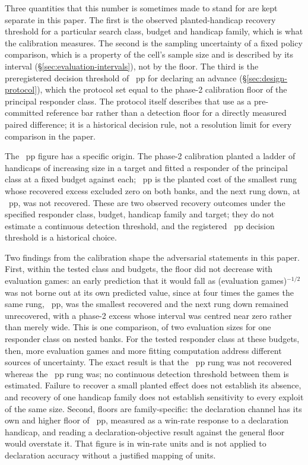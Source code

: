 Three quantities that this number is sometimes made to stand for are kept separate in this paper.
The first is the observed planted-handicap recovery threshold for a particular search class,
budget and handicap family, which is what the calibration measures. The second is the sampling
uncertainty of a fixed policy comparison, which is a property of the cell's sample size and is
described by its interval (\S\ref{sec:evaluation-intervals}), not by the floor. The third is the
preregistered decision threshold of \vsevenPrimaryFloor{}~pp for declaring an advance
(\S\ref{sec:design-protocol}), which the protocol set equal to the phase-2 calibration floor of the
principal responder class. The protocol itself describes that use as a pre-committed reference bar
rather than a detection floor for a directly measured paired difference; it is a historical
decision rule, not a resolution limit for every comparison in the paper.

The \vsevenPrimaryFloor{}~pp figure has a specific origin. The phase-2 calibration planted a ladder
of handicaps of increasing size in a \vsix{} target and fitted a responder of the principal class at
a fixed budget against each; \vsevenPrimaryFloor{}~pp is the planted cost of the smallest rung
whose recovered excess excluded zero on both banks, and the next rung down, at
\vsevenFloorRungBelow{}~pp, was not recovered. These are two observed recovery outcomes under the
specified responder class, budget, handicap family and target; they do not estimate a continuous
detection threshold, and the registered \vsevenPrimaryFloor{}~pp decision threshold is a
historical choice.

Two findings from the calibration shape the adversarial statements in this paper. First, within the
tested class and budgets, the floor did not decrease with evaluation games: an early prediction that
it would fall as (evaluation games)$^{-1/2}$ was not borne out at its own predicted value, since at
four times the games the same rung, \vsevenPrimaryFloor{}~pp, was the smallest recovered and the
next rung down remained unrecovered, with a phase-2 excess whose interval was centred near zero
rather than merely wide. This is one comparison, of two evaluation sizes for one responder class on
nested banks. For the tested responder class at these
budgets, then, more evaluation games and more fitting computation address different sources of
uncertainty. The exact result is that the \vsevenFloorRungBelow{}~pp rung was not recovered whereas
the \vsevenPrimaryFloor{}~pp rung was; no continuous detection threshold between them is estimated.
Failure to recover a small planted effect does not establish its absence, and recovery of one
handicap family does not establish sensitivity to every exploit of the same size. Second, floors are
family-specific: the declaration channel has its own and higher floor of \vsevenDeclFloor{}~pp,
measured as a win-rate response to a declaration handicap, and reading a declaration-objective
result against the general floor would overstate it. That figure is in win-rate units and is not
applied to declaration accuracy without a justified mapping of units.

